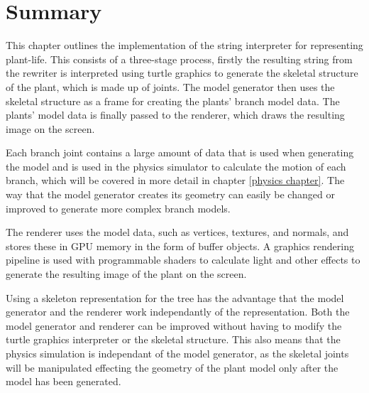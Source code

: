 \section{Summary}

This chapter outlines the implementation of the string interpreter for representing plant-life. This consists of a three-stage process, firstly the resulting string from the rewriter is interpreted using turtle graphics to generate the skeletal structure of the plant, which is made up of joints. The model generator then uses the skeletal structure as a frame for creating the plants' branch model data. The plants' model data is finally passed to the renderer, which draws the resulting image on the screen. 

Each branch joint contains a large amount of data that is used when generating the model and is used in the physics simulator to calculate the motion of each branch, which will be covered in more detail in chapter \ref{physics chapter}. The way that the model generator creates its geometry can easily be changed or improved to generate more complex branch models. 

The renderer uses the model data, such as vertices, textures, and normals, and stores these in GPU memory in the form of buffer objects. A graphics rendering pipeline is used with programmable shaders to calculate light and other effects to generate the resulting image of the plant on the screen. 

Using a skeleton representation for the tree has the advantage that the model generator and the renderer work independantly of the representation. Both the model generator and renderer can be improved without having to modify the turtle graphics interpreter or the skeletal structure. This also means that the physics simulation is independant of the model generator, as the skeletal joints will be manipulated effecting the geometry of the plant model only after the model has been generated. 






